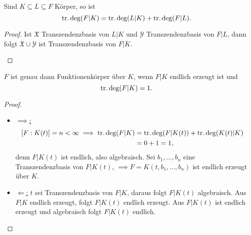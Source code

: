 \begin{korollar}
    Sind $K \subseteq L \subseteq F$ Körper, so ist 
    $$ \operatorname{tr.deg}(F|K) = \operatorname{tr.deg}(L|K) + \operatorname{tr.deg}(F|L). $$
\end{korollar}
\begin{proof}
    Ist $\mathfrak{X}$ Transzendenzbasis von $L|K$ und $\mathcal{Y}$ Transzendenzbasis von $F|L$, dann folgt
    $ \mathfrak{X} \cup \mathcal{Y}$ ist Transzendenzbasis von $F|K$.
    \begin{figure}[H]
        \centering
    \end{figure}
\end{proof}

\begin{satz}
    $F$ ist genau dann Funktionenkörper über $K$, wenn $F|K$ endlich erzeugt ist und 
    $$ \operatorname{tr.deg}(F|K) = 1. $$
\end{satz}
\begin{proof}
    \begin{itemize}[label=]
        \item \underline{$\implies$:}
        \begin{align*}
            \left[F:K(t)\right] = n < \infty \implies \operatorname{tr.deg}(F|K) & = \operatorname{tr.deg}(F|K(t)) + \operatorname{tr.deg}(K(t)|K)\\
            & = 0 + 1 = 1,
        \end{align*}
        denn $F|K(t)$ ist endlich, also algebraisch.
        Sei $b_1,...,b_n$ eine Transzendenzbasis von $F|K(t)$, $\implies F=K(t, b_1,...,b_n)$ ist endlich erzeugt über $K$. 
        \item \underline{$\Longleftarrow$:}
        $t$ sei Transzendenzbasis von $F|K$, daraus folgt $F|K(t)$ algebraisch.
        Aus $F|K$ endlich erzeugt, folgt $F|K(t)$ endlich erzeugt.
        Aus $F|K(t)$ ist endlich erzeugt und algebraisch folgt $F|K(t)$ endlich.
    \end{itemize}
\end{proof}

